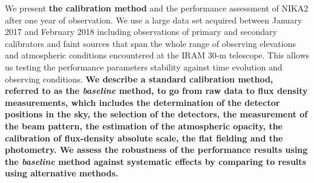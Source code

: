 \documentclass[traditionalabstract]{aa}
\newcommand{\lp}[1]{\bf \color[RGB]{230, 0, 92} #1}
\begin{document}
       {We present {\lp the calibration method} and the performance assessment of NIKA2 after one year of observation.}
       {We use a large data set acquired between January 2017 and
         February 2018 including observations of primary and secondary
         calibrators and faint sources that span the whole range
         of observing elevations and atmospheric conditions encountered at the
         IRAM 30-m telescope. This allows us testing the
         performance parameters stability against time evolution and
         observing conditions. {\lp We describe a standard calibration
         method, referred to as the \emph{baseline} method, to go from
         raw data to flux density measurements, which includes the
         determination of the detector positions in the sky, the
         selection of the detectors, the measurement of
         the beam pattern, the estimation of the 
         atmospheric opacity, the calibration of flux-density absolute
         scale, the flat fielding and the photometry. We
         assess the robustness of the performance results using the
         \emph{baseline} method against systematic effects by
         comparing to results using alternative methods.}  
       }
\end{document}
